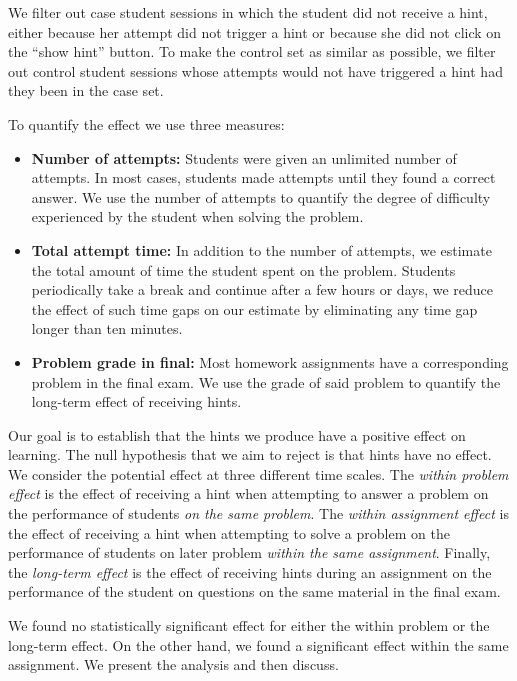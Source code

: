 \documentclass{llncs2e/llncs}
\begin{document}
We filter out case student sessions in which the student did not receive a hint, either because her attempt did not trigger a hint or because she did not click on the ``show hint'' button.  To make the control set as similar as possible, we filter out control student sessions whose attempts would not have triggered a hint had they been in the case set.

To quantify the effect we use three measures:
\begin{itemize}
\item {\bf Number of attempts:} Students were given an unlimited number of attempts. In most cases, students made attempts until they found a correct answer. We use the number of attempts to quantify the degree of difficulty experienced by the student when solving the problem.

\item {\bf Total attempt time:} In addition to the number of attempts, we estimate the total amount of time the student spent on the problem. Students periodically take a break and continue after a few hours or days, we reduce the effect of such time gaps on our estimate by eliminating any time gap longer than ten minutes.

\item {\bf Problem grade in final:} Most homework assignments have a corresponding problem in the final exam. We use the grade of said problem to quantify the long-term effect of receiving hints. 
\end{itemize}

Our goal is to establish that the hints we produce have a positive effect on learning. The null hypothesis that we aim to reject is that hints have no effect. We consider the potential effect at three different time scales. The {\em within problem effect} is the effect of receiving a hint when attempting to answer a problem on the performance of students {\em on the same problem}. The {\em within assignment effect} is the effect of receiving a hint when attempting to solve a problem on the performance of students on later problem {\em within the same assignment}. Finally, the {\em long-term effect} is the effect of receiving hints during an assignment on the performance of the student on questions on the same material in the final exam.

We found no statistically significant effect for either the within problem or the long-term effect. On the other hand, we found a significant effect within the same assignment. We present the analysis and then discuss.
\end{document}
